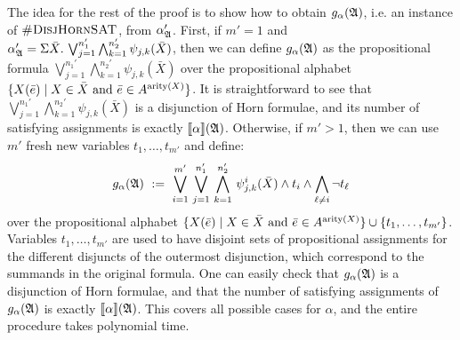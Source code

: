 The idea for the rest of the proof is to show how to obtain $g_{\alpha}(\mathfrak{A})$, i.e. an instance of $\textsc{\#DisjHornSAT}$, from $\alpha_{\mathfrak{A}}'$.
First, if $m' = 1$ and $\alpha_{\mathfrak{A}}' = \Sigma{\bar{X}}.\,\bigvee_{j = 1}^{n_1'}\bigwedge_{k = 1}^{n_2'}\psi_{j,k}(\bar{X})$, then we can define $g_{\alpha}(\mathfrak{A})$ as the propositional formula $\bigvee_{j = 1}^{n_1'}\bigwedge_{k = 1}^{n_2'}\psi_{j,k}(\bar{X})$ over the propositional alphabet $\{X(\bar{e}) \mid X \in \bar{X} \text{ and } \bar{e}\in A^{{\rm arity}(X)} \}$. It is straightforward to see that $\bigvee_{j = 1}^{n_1'}\bigwedge_{k = 1}^{n_2'}\psi_{j,k}(\bar{X})$ is a disjunction of Horn formulae, and its number of satisfying assignments is exactly ${\llbracket{}{\alpha}\rrbracket}(\mathfrak{A})$. 
Otherwise, if $m' > 1$, then we can use $m'$ fresh new variables $t_1,\ldots,t_{m'}$ and define:
$$
g_{\alpha}(\A) \ := \ \bigvee_{i=1}^{m'} \, \bigvee_{j = 1}^{n_1'} \, \bigwedge_{k = 1}^{n_2'} \, \psi^i_{j,k}(\bar{X}) \wedge t_i \wedge \bigwedge_{\ell \neq i} \neg t_{\ell}
$$ 
over the propositional alphabet $\{X(\bar{e}) \mid X \in \bar{X} \text{ and } \bar{e}\in A^{{\rm arity}(X)} \} \cup \{t_1,\ldots,t_{m'}\}$.
Variables $t_1,\ldots,t_{m'}$ are used to have disjoint sets of propositional assignments for the different disjuncts of the outermost disjunction, which correspond to the summands in the original formula.
One can easily check that $g_{\alpha}(\mathfrak{A})$ is a disjunction of Horn formulae, and that the number of satisfying assignments of $g_{\alpha}(\mathfrak{A})$ is exactly ${\llbracket{}{\alpha}\rrbracket}(\mathfrak{A})$. This covers all possible cases for $\alpha$, and the entire procedure takes polynomial time.

